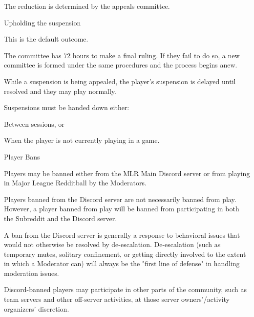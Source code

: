 \begin{deepEnumerate}
\begin{deepEnumerate}
\begin{deepEnumerate}
\begin{deepEnumerate}
				\item The reduction is determined by the appeals committee.
			\end{deepEnumerate}
			\item Upholding the suspension
			\begin{deepEnumerate}
				\item This is the default outcome.
			\end{deepEnumerate}
		\end{deepEnumerate}
		\item The committee has 72 hours to make a final ruling. If they fail to do so, a new committee is formed under the same procedures and the process begins anew.
		\item While a suspension is being appealed,	the player's suspension is delayed until resolved and they may play normally.
	\end{deepEnumerate}
	\item Suspensions must be handed down either:
	\begin{deepEnumerate}
		\item Between sessions, or
		\item When the player is not currently playing in a game.
	\end{deepEnumerate}
	\item Player Bans
	\begin{deepEnumerate}
		\item Players may be banned either from the MLR Main Discord server or from playing in Major League Redditball by the Moderators.
		\begin{deepEnumerate}
			\item Players banned from the Discord server are not necessarily banned from play.
			However, a player banned from play will be banned from participating in both the Subreddit and the Discord server.
			\item A ban from the Discord server is generally a response to behavioral issues that would not otherwise be resolved by de-escalation. De-escalation
			(such as temporary mutes, solitary confinement, or getting directly involved to the extent in which a Moderator can) will always be the "first line of defense" 
			in handling moderation issues.
			\begin{deepEnumerate}
				\item Discord-banned players may participate in other parts of the community, such as team servers and other off-server activities, 
				at those server owners'/activity organizers' discretion.

\end{deepEnumerate}
\end{deepEnumerate}
\end{deepEnumerate}
\end{deepEnumerate}
